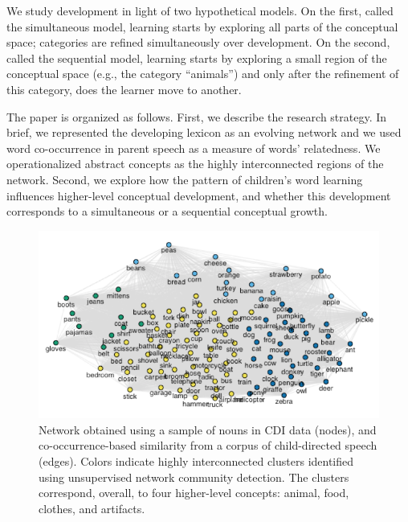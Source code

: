 \documentclass[11pt]{article}
\newenvironment{CodeChunk}{}{}
\begin{document}
We study development in light of two hypothetical models. On the first,
called the simultaneous model, learning starts by exploring all parts of
the conceptual space; categories are refined simultaneously over
development. On the second, called the sequential model, learning starts
by exploring a small region of the conceptual space (e.g., the category
``animals'') and only after the refinement of this category, does the
learner move to another.

The paper is organized as follows. First, we describe the research
strategy. In brief, we represented the developing lexicon as an evolving
network and we used word co-occurrence in parent speech as a measure of
words' relatedness. We operationalized abstract concepts as the highly
interconnected regions of the network. Second, we explore how the
pattern of children's word learning influences higher-level conceptual
development, and whether this development corresponds to a simultaneous
or a sequential conceptual growth.

\begin{CodeChunk}
\captionsetup{width=0.8\textwidth}\begin{figure}[h]

{\centering \includegraphics{figs/network-1} 

}

\caption[Network obtained using a sample of nouns in CDI data (nodes), and co-occurrence-based similarity from a corpus of child-directed speech (edges)]{Network obtained using a sample of nouns in CDI data (nodes), and co-occurrence-based similarity from a corpus of child-directed speech (edges). Colors indicate highly interconnected clusters identified using unsupervised network community detection. The clusters correspond, overall, to four higher-level concepts: animal, food, clothes, and artifacts.}\label{fig:network}
\end{figure}
\end{CodeChunk}
\end{document}
